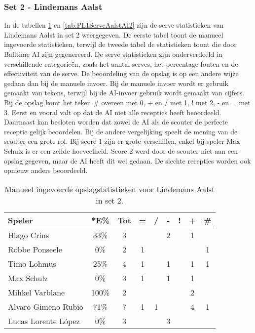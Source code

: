 \subsubsection{Set 2 - Lindemans Aalst}
\label{sec:PL1_Aalst2}
In de tabellen \ref{tab:PL1ServeAalstMan2} en \ref{tab:PL1ServeAalstAI2} zijn de serve statistieken van Lindemans Aalst in set 2 weergegeven. De eerste tabel toont de manueel ingevoerde statistieken, terwijl de tweede tabel de statistieken toont die door Balltime AI zijn gegenereerd. De serve statistieken zijn onderverdeeld in verschillende categorieën, zoals het aantal serves, het percentage fouten en de effectiviteit van de serve. De beoordeling van de opslag is op een andere wijze gedaan dan bij de manuele invoer. Bij de manuele invoer wordt er gebruik gemaakt van tekens, terwijl bij de AI-invoer gebruik wordt gemaakt van cijfers. Bij de opslag komt het teken \# overeen met 0, + en / met 1, ! met 2, - en = met 3. Eerst en vooral valt op dat de AI niet alle recepties heeft beoordeeld. Daarnaast kan besloten worden dat zowel de AI als de scouter de perfecte receptie gelijk beoordelen. Bij de andere vergelijking speelt de mening van de scouter een grote rol. Bij score 1 zijn er grote verschillen, enkel bij speler Max Schulz is er een zelfde hoeveelheid. Score 2 werd door de scouter niet aan een opslag gegeven, maar de AI heeft dit wel gedaan. De slechte recepties worden ook opnieuw anders beoordeeld.

\begin{table}[ht!]
  \centering
  \scriptsize
    \begin{tabular}{|l|c|c|c|c|c|c|c|c|} \hline
      \textbf{Speler} & *E\% & Tot & = & / & - & ! & + & \# \\ \hline
      Hiago Crins & 33\% & 3 &  &  & 2 &  & 1 & \\ 
      Robbe Ponseele & 0\% & 2 & 1 & & & & & 1 \\
      Timo Lohmus & 25\% & 4 & 1 &  & 1 & & 1 & 1 \\ 
      Max Schulz & 0\% & 3 & 1 &  & 1 &  & 1 &  \\ 
      Mihkel Varblane & 100\% & 2 &  &  &  &  & 2 & \\
      Alvaro Gimeno Rubio & 71\% & 7 & 1 & 1 &  &  & 4 & 1\\
      Lucas Lorente López & 0\% & 3 &  &  & 3 &  &  &  \\ \hline
  \end{tabular}
  \caption[Manueel ingevoerde opslagstatistieken voor Lindemans Aalst in set 2]{\label{tab:PL1ServeAalstMan2}Manueel ingevoerde opslagstatistieken voor Lindemans Aalst in set 2.}
\end{table}

